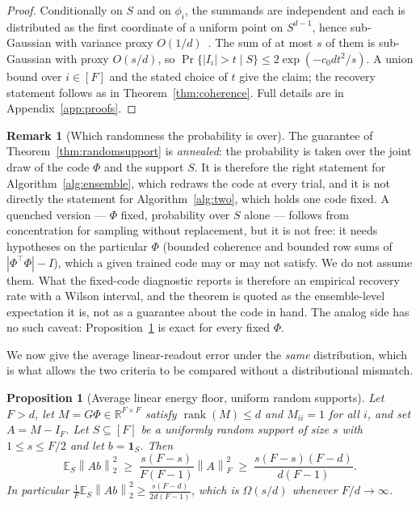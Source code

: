 \documentclass[preprint,12pt]{elsarticle}
\newtheorem{proposition}[theorem]{Proposition}
\theoremstyle{definition}
\newtheorem{remark}[theorem]{Remark}
\newcommand{\R}{\mathbb{R}}
\newcommand{\E}{\mathbb{E}}
\newcommand{\norm}[1]{\left\lVert #1 \right\rVert}
\begin{document}
\begin{proof}
Conditionally on $S$ and on $\phi_i$, the summands are independent and each is distributed as
the first coordinate of a uniform point on $S^{d-1}$, hence sub-Gaussian with variance proxy
$O(1/d)$~\cite[Thm.~3.4.6]{vershynin2018hdp}. The sum of at most $s$ of them is sub-Gaussian
with proxy $O(s/d)$, so $\Pr\{|I_i|>t\mid S\}\le2\exp(-c_0dt^2/s)$. A union bound over
$i\in[F]$ and the stated choice of $t$ give the claim; the recovery statement follows as in
Theorem~\ref{thm:coherence}. Full details are in Appendix~\ref{app:proofs}.
\end{proof}

\begin{remark}[Which randomness the probability is over]
\label{rem:annealed}
The guarantee of Theorem~\ref{thm:randomsupport} is \emph{annealed}: the probability is taken
over the joint draw of the code $\Phi$ and the support $S$. It is therefore the right statement
for Algorithm~\ref{alg:ensemble}, which redraws the code at every trial, and it is not directly
the statement for Algorithm~\ref{alg:two}, which holds one code fixed. A quenched version ---
$\Phi$ fixed, probability over $S$ alone --- follows from concentration for sampling without
replacement, but it is not free: it needs hypotheses on the particular $\Phi$ (bounded
coherence and bounded row sums of $|\Phi^{\top}\Phi|-I$), which a given trained code may or may
not satisfy. We do not assume them. What the fixed-code diagnostic reports is therefore an
empirical recovery rate with a Wilson interval, and the theorem is quoted as the ensemble-level
expectation it is, not as a guarantee about the code in hand. The analog side has no such
caveat: Proposition~\ref{prop:uniform-energy} is exact for every fixed $\Phi$.
\end{remark}

We now give the average linear-readout error under the \emph{same} distribution, which is what
allows the two criteria to be compared without a distributional mismatch.

\begin{proposition}[Average linear energy floor, uniform random supports]
\label{prop:uniform-energy}
Let $F>d$, let $M=G\Phi\in\R^{F\times F}$ satisfy $\operatorname{rank}(M)\le d$ and $M_{ii}=1$
for all $i$, and set $A=M-I_F$. Let $S\subseteq[F]$ be a uniformly random support of size $s$
with $1\le s\le F/2$ and let $b=\mathbf 1_S$. Then
\begin{equation}
  \E_S\norm{Ab}_2^2
  \;\ge\;\frac{s(F-s)}{F(F-1)}\norm{A}_F^2
  \;\ge\;\frac{s(F-s)(F-d)}{d(F-1)} .
  \label{eq:energyfloor}
\end{equation}
In particular $\frac1F\E_S\norm{Ab}_2^2\ge\frac{s(F-d)}{2d(F-1)}$, which is $\Omega(s/d)$
whenever $F/d\to\infty$.
\end{proposition}
\end{document}
